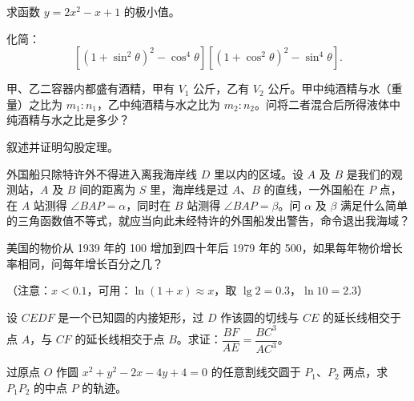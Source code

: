 \begin{question}
求函数 $y=2x^2-x+1$ 的极小值。

\end{question}
\begin{question}
化简：
\nopagebreak[4]
\[
\left[(1+\sin^2\theta)^2-\cos^4\theta\right]\left[(1+\cos^2\theta)^2-\sin^4\theta\right].
\]

\end{question}
\begin{question}
甲、乙二容器内都盛有酒精，甲有 $V_1$ 公斤，乙有 $V_2$ 公斤。甲中纯酒精与水（重量）之比为 $m_1:n_1$，乙中纯酒精与水之比为 $m_2:n_2$。问将二者混合后所得液体中纯酒精与水之比是多少？

\end{question}
\begin{question}
叙述并证明勾股定理。

\end{question}
\begin{question}
外国船只除特许外不得进入离我海岸线 $D$ 里以内的区域。设 $A$ 及 $B$ 是我们的观测站，$A$ 及 $B$ 间的距离为 $S$ 里，海岸线是过 $A$、$B$ 的直线，一外国船在 $P$ 点，在 $A$ 站测得 $\angle BAP=\alpha$，同时在 $B$ 站测得 $\angle BAP=\beta$。问 $\alpha$ 及 $\beta$ 满足什么简单的三角函数值不等式，就应当向此未经特许的外国船发出警告，命令退出我海域？

\end{question}
\begin{question}
美国的物价从 1939 年的 100 增加到四十年后 1979 年的 500，如果每年物价增长率相同，问每年增长百分之几？

（注意：$x<0.1$，可用：$\ln(1+x)\approx x$，取 $\lg 2=0.3$，$\ln 10=2.3$）

\Needspace{0.4\textheight}
\end{question}
\begin{question}
设 $CEDF$ 是一个已知圆的内接矩形，过 $D$ 作该圆的切线与 $CE$ 的延长线相交于点 $A$，与 $CF$ 的延长线相交于点 $B$。求证：$\dfrac{BF}{AE}=\dfrac{BC^3}{AC^3}$。
\nopagebreak[4]
\begin{center}\end{center}
\nopagebreak[4]
\end{question}
\begin{question}
过原点 $O$ 作圆 $x^2+y^2-2x-4y+4=0$ 的任意割线交圆于 $P_1$、$P_2$ 两点，求 $P_1P_2$ 的中点 $P$ 的轨迹。

\end{question}